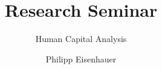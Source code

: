 

\title{Research Seminar}
\subtitle{Human Capital Analysis}
\author{Philipp Eisenhauer}

\date{}

\let\otp\titlepage
